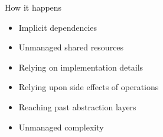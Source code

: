\documentclass[xcolor=svgnames]{beamer}
\begin{document}



{%
%
\begin{frame}{\subsecname}

    How it happens
    \begin{itemize}
        \pause \item Implicit dependencies
        \pause \item Unmanaged shared resources
        \pause \item Relying on implementation details
        \pause \item Relying upon side effects of operations
        \pause \item Reaching past abstraction layers
        \pause \item Unmanaged complexity
    \end{itemize}
\end{frame}
}





\end{document}
